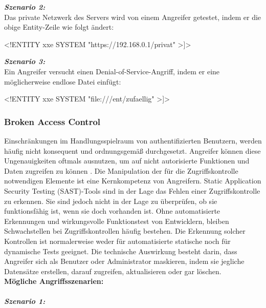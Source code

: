 \textbf{\textit{Szenario 2:}}\\
Das private Netzwerk des Servers wird von einem Angreifer getestet, indem er die obige Entity-Zeile wie folgt ändert\cite[10]{owasp17top10}:\\

\begin{LaTeXCode}[caption={XML-Beispiel 2},captionpos=b, label=LaTeXCode:xxe2][numbers=none]
<!ENTITY xxe SYSTEM "https://192.168.0.1/privat" >]>
\end{LaTeXCode}

\textbf{\textit{Szenario 3:}}\\
Ein Angreifer versucht einen Denial-of-Service-Angriff, indem er eine möglicherweise endlose Datei einfügt\cite[10]{owasp17top10}:\\

\begin{LaTeXCode}[caption={XML-Beispiel 3},captionpos=b, label=LaTeXCode:xxe3][numbers=none]
<!ENTITY xxe SYSTEM "file:///ent/zufaellig" >]>
\end{LaTeXCode}

\subsubsection{Broken Access Control}

Einschränkungen im Handlungsspielraum von authentifizierten Benutzern, werden häufig nicht konsequent und ordnungsgemäß durchgesetzt. Angreifer können diese Ungenauigkeiten oftmals ausnutzen, um auf nicht autorisierte Funktionen und Daten zugreifen zu können \cite[6]{owasp17top10}. Die Manipulation der für die Zugriffskontrolle notwendigen Elemente ist eine Kernkompetenz von Angreifern. Static Application Security Testing (SAST)-Tools sind in der Lage das Fehlen einer Zugriffskontrolle zu erkennen. Sie sind jedoch nicht in der Lage zu überprüfen, ob sie funktionsfähig ist, wenn sie doch vorhanden ist. Ohne automatisierte Erkennungen und wirkungsvolle Funktionstest von Entwicklern, bleiben Schwachstellen bei Zugriffskontrollen häufig bestehen. Die Erkennung solcher Kontrollen ist normalerweise weder für automatisierte statische noch für dynamische Tests geeignet. Die technische Auswirkung besteht darin, dass Angreifer sich als Benutzer oder Administrator maskieren, indem sie jegliche Datensätze erstellen, darauf zugreifen, aktualisieren oder gar löschen\cite[11]{owasp17top10}.\\

\textbf{Mögliche Angriffsszenarien:}\\
\\
\textbf{\textit{Szenario 1:}}\\

